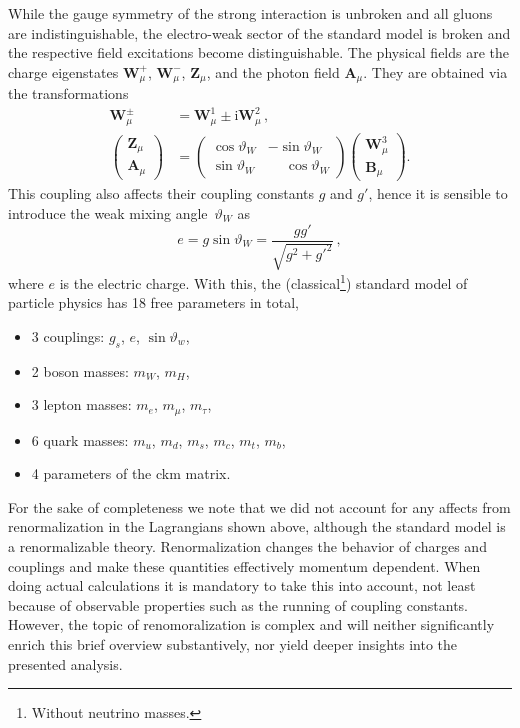 While the gauge symmetry of the strong interaction is unbroken and all gluons are indistinguishable, the electro-weak sector of the standard model is broken and the respective field excitations become distinguishable.
The physical fields are the charge eigenstates $\mathbf{W}^+_\mu$, $\mathbf{W}^-_\mu$, $\mathbf{Z}_\mu$, and the photon field $\mathbf{A}_\mu$.
They are obtained via the transformations
\begin{align*}
  \mathbf{W}_\mu^\pm &= \mathbf{W}_\mu^1 \pm \mathrm{i} \mathbf{W}_\mu^2 \,, \\ 
  \begin{pmatrix} \mathbf{Z}_\mu \\ \mathbf{A}_\mu \end{pmatrix} &= \begin{pmatrix} \cos \vartheta_W & -\sin \vartheta_W \\ \sin \vartheta_W & \phantom{-} \cos \vartheta_W \end{pmatrix} \begin{pmatrix} \mathbf{W}^3_\mu \\ \mathbf{B}_\mu \end{pmatrix}.
\end{align*}
This coupling also affects their coupling constants $g$ and $g'$, hence it is sensible to introduce the weak mixing angle~$\vartheta_W$ as
\begin{equation*}
  e = g \sin \vartheta_W = \frac{gg'}{\sqrt{g^2 + g'^2}} \,,
\end{equation*}
where $e$ is the electric charge.
With this, the (classical\footnote{Without neutrino masses.}) standard model of particle physics has 18 free parameters in total,
\begin{itemize}[itemsep=2pt,parsep=2pt]
  \item 3 couplings: $g_s$, $e$, $\sin \vartheta_w$,
  \item 2 boson masses: $m_W$, $m_H$,
  \item 3 lepton masses: $m_e$, $m_\mu$, $m_\tau$,
  \item 6 quark masses: $m_u$, $m_d$, $m_s$, $m_c$, $m_t$, $m_b$,
  \item 4 parameters of the \gls{ckm} matrix.
\end{itemize}

For the sake of completeness we note that we did not account for any affects from renormalization in the Lagrangians shown above, although the standard model is a renormalizable theory.
Renormalization changes the behavior of charges and couplings and make these quantities effectively momentum dependent.
When doing actual calculations it is mandatory to take this into account, not least because of observable properties such as the running of coupling constants.
However, the topic of renomoralization is complex and will neither significantly enrich this brief overview substantively, nor yield deeper insights into the presented analysis.

